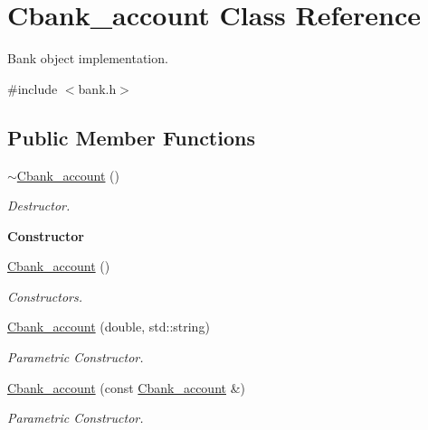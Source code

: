 \hypertarget{class_cbank__account}{}\section{Cbank\+\_\+account Class Reference}
\label{class_cbank__account}


Bank object implementation.  




{\ttfamily \#include $<$bank.\+h$>$}

\subsection*{Public Member Functions}
\begin{DoxyCompactItemize}
\item 
\hyperlink{class_cbank__account_a6a445565be4138841cd9ae19a284c6a3}{$\sim$\+Cbank\+\_\+account} ()\hypertarget{class_cbank__account_a6a445565be4138841cd9ae19a284c6a3}{}\label{class_cbank__account_a6a445565be4138841cd9ae19a284c6a3}

\begin{DoxyCompactList}\small\item\em Destructor. \end{DoxyCompactList}\end{DoxyCompactItemize}
\begin{Indent}{\bf Constructor}\par
\begin{DoxyCompactItemize}
\item 
\hyperlink{class_cbank__account_ab33d4d440a059df6781a6007e02ecf60}{Cbank\+\_\+account} ()
\begin{DoxyCompactList}\small\item\em Constructors. \end{DoxyCompactList}\item 
\hyperlink{class_cbank__account_adf010826ed71b599d7b9292e1c7ff971}{Cbank\+\_\+account} (double, std\+::string)
\begin{DoxyCompactList}\small\item\em Parametric Constructor. \end{DoxyCompactList}\item 
\hyperlink{class_cbank__account_ae249ba9bfa4100cdc8deff17133e2914}{Cbank\+\_\+account} (const \hyperlink{class_cbank__account}{Cbank\+\_\+account} \&)
\begin{DoxyCompactList}\small\item\em Parametric Constructor. \end{DoxyCompactList}\end{DoxyCompactItemize}
\end{Indent}
